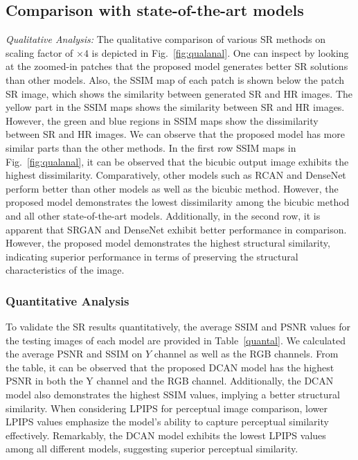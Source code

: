 \documentclass[conference]{IEEEtran}
\begin{document}
\subsection{Comparison with state-of-the-art models}

\textit{Qualitative Analysis:}
The qualitative comparison of various SR methods on scaling factor of $\times4$ is depicted in Fig.~\ref{fig:qualanal}. One can inspect by looking at the zoomed-in patches that the proposed model generates better SR solutions than other models. Also, the SSIM map of each patch is shown below the patch SR image, which shows the similarity between generated SR and HR images. The yellow part in the SSIM maps shows the similarity between SR and HR images. However, the green and blue regions in SSIM maps show the dissimilarity between SR and HR images. We can observe that the proposed model has more similar parts than the other methods.  In the first row SSIM maps in Fig.~\ref{fig:qualanal}, it can be observed that the bicubic output image exhibits the highest dissimilarity. Comparatively, other models such as RCAN and DenseNet perform better than other models as well as the bicubic method. However, the proposed model demonstrates the lowest dissimilarity among the bicubic method and all other state-of-the-art models. Additionally, in the second row, it is apparent that SRGAN and DenseNet exhibit better performance in comparison. However, the proposed model demonstrates the highest structural similarity, indicating superior performance in terms of preserving the structural characteristics of the image. 

\subsubsection*{Quantitative Analysis}
To validate the SR results quantitatively, the average SSIM and PSNR values for the testing images of each model are provided in Table~\ref{quantal}. We calculated the average PSNR and SSIM on $Y$ channel as well as the RGB channels. From the table, it can be observed that the proposed DCAN model has the highest PSNR in both the Y channel and the RGB channel. Additionally, the DCAN model also demonstrates the highest SSIM values, implying a better structural similarity. When considering LPIPS for perceptual image comparison, lower LPIPS values emphasize the model's ability to capture perceptual similarity effectively. Remarkably, the DCAN model exhibits the lowest LPIPS values among all different models, suggesting superior perceptual similarity. 
\end{document}
